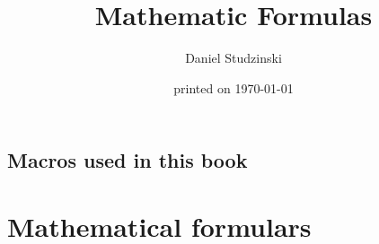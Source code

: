 \documentclass[a4paper,10pt,twoside,titlepage]{book}
\begin{document}
\newsavebox{\mySd}

\title{Mathematic Formulas}
\date{printed on \today}
\author{Daniel Studzinski}
\maketitle
\section*{Macros used in this book}
   \label{DSmyMacro}\clearpage
\tableofcontents                  \cleardoublepage

\chapter*{Mathematical formulars}



















\printindex
\end{document}

